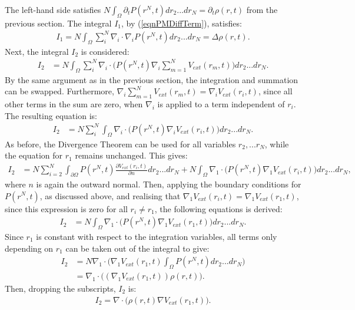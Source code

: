 The left-hand side satisfies $N\int_\Omega \partial_t P(r^N,t) dr_2...dr_N= \partial_t \rho(r,t)$ from the previous section.
The integral $I_1$, by (\ref{eqnPMDiffTerm}), satisfies:
\begin{align} \label{eqnPInt1}
I_1=  N\int_\Omega \sum_{i}^N \nabla_i \cdot \nabla_i P(r^N,t)dr_2...dr_N = \Delta \rho(r,t).
\end{align}
Next, the integral $I_2$ is considered:
\begin{align*}
I_2&=N\int_\Omega \sum_{i}^N \nabla_i \cdot \bigg( P(r^N,t) \nabla_i \sum_{m=1}^N V_{ext}(r_m,t) \bigg) dr_2...dr_N. 
\end{align*}
By the same argument as in the previous section, the integration and summation can be swapped. Furthermore, $\nabla_i \sum_{m=1}^N V_{ext}(r_m,t) =\nabla_i V_{ext}(r_i,t)$, since all other terms in the sum are zero, when $\nabla_i$ is applied to a term independent of $r_i$. The resulting equation is:
\begin{align*}
I_2&=N\sum_{i}^N\int_\Omega  \nabla_i \cdot \bigg( P(r^N,t) \nabla_i V_{ext}(r_i,t) \bigg) dr_2...dr_N. 
\end{align*}
As before, the Divergence Theorem can be used for all variables $r_2,...r_N$, while the equation for $r_1$ remains unchanged. This gives:
\begin{align*}
I_2&=N\sum_{i=2 }^N\int_{ \partial \Omega}  P(r^N,t) \frac{\partial V_{ext}(r_i,t)}{\partial {n}}  dr_2...dr_N + N\int_\Omega  \nabla_1 \cdot \bigg( P(r^N,t) \nabla_1 V_{ext}(r_i,t) \bigg) dr_2...dr_N, 
\end{align*}
where ${n}$ is again the outward normal.
Then, applying the boundary conditions for $P(r^N,t)$, as discussed above, and realising that $\nabla_1 V_{ext}(r_i,t)=\nabla_1 V_{ext}(r_1,t)$, since this expression is zero for all $r_i \neq r_1$, the following equations is derived:
\begin{align*}
I_2&= N \int_\Omega  \nabla_1 \cdot \bigg( P(r^N,t) \nabla_1 V_{ext}(r_1,t) \bigg) dr_2...dr_N. 
\end{align*}
Since $r_1$ is constant with respect to the integration variables, all terms only depending on $r_1$ can be taken out of the integral to give:
\begin{align*}
I_2&= N \nabla_1 \cdot \bigg(\nabla_1 V_{ext}(r_1,t)\int_\Omega  P(r^N,t) dr_2...dr_N\bigg)\\
&=   \nabla_1 \cdot \bigg( (\nabla_1 V_{ext}(r_1,t)) \rho(r,t)\bigg).
\end{align*}
Then, dropping the subscripts, $I_2$ is:
\begin{align}\label{eqnPInt2}
I_2= \nabla \cdot \bigg( \rho(r,t)\nabla V_{ext}(r_1,t) \bigg).
\end{align}


